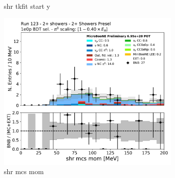 \begin{figure}[H]
\begin{subfigure}{0.3\textwidth}
    \caption{shr tkfit start y}
    \end{subfigure}
    \begin{subfigure}{0.3\textwidth}
    \includegraphics[width=1.0\textwidth]{Sidebands/Figures/TwoShr_1e0pSel/BDT/shrMCSMom.pdf}
    \caption{shr mcs mom}
    \end{subfigure}
    \caption{} 
    \label{fig:HE_1eNp_1}
\end{figure}

